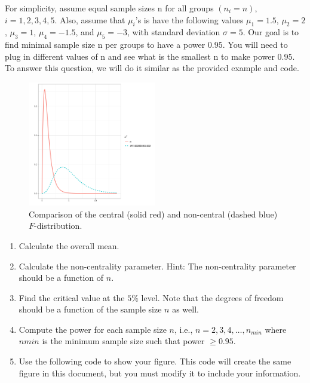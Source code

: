 \documentclass{article}
\begin{document}
For simplicity, assume equal sample sizes n for all groups $(n_i = n)$, $i = 1, 2, 3, 4, 5$. Also, assume
that $\mu_i$'s is have the following values $\mu_1 = 1.5$, $\mu_2 = 2$, $\mu_3 = 1$, $\mu_4 = -1.5$, and $\mu_5 = -3$, with standard
deviation $\sigma = 5$. Our goal is to find minimal sample size n per groups to have a power $0.95$. You
will need to plug in different values of n and see what is the smallest n to make power $0.95$. To
answer this question, we will do it similar as the provided example and code.
\begin{figure}[H]
	\centering
	\includegraphics[width=0.5\textwidth]{assets/prob6.png}
	\caption{Comparison of the central (solid red) and non-central (dashed blue) $F$-distribution.}
\end{figure}

\begin{enumerate}
	\item Calculate the overall mean.
	\item Calculate the non-centrality parameter. Hint: The non-centrality parameter
	      should be a function of $n$.
	\item Find the critical value at the $5\%$ level. Note that the degrees of freedom should be a function of the
	      sample size $n$ as well.
	\item Compute the power for each sample size $n$, i.e., $n=2,3,4,\ldots,n_{min}$
	      where $n{min}$ is the minimum sample size such that power $\ge 0.95$.
	\item Use the following code to show your figure. This code will create the same figure in this document, but you
	      must modify it to include your information.
\end{enumerate}

\begin{rbox}
	\inputminted{r}{code/prob6.R}
\end{rbox}
\end{document}
